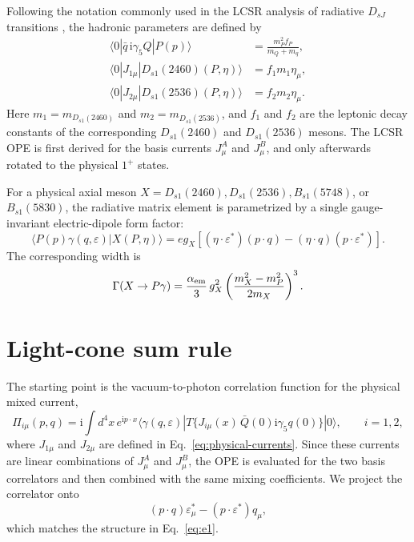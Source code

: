 \documentclass[aps,prd,preprint,nofootinbib,superscriptaddress]{revtex4-2}
\newcommand{\ii}{\mathrm{i}}
\newcommand{\Dsone}{D_{s1}}
\newcommand{\Bsone}{B_{s1}}
\begin{document}
Following the notation commonly used in the LCSR analysis of radiative
$D_{sJ}$ transitions \cite{Colangelo:2005hv}, the hadronic parameters are
defined by
\begin{align}
  \langle 0|\bar q\,\ii\gamma_5 Q|P(p)\rangle
  &=
  \frac{m_P^2 f_P}{m_Q+m_q},\label{eq:fp-def}\\
  \langle0|J_{1\mu}|\Dsone(2460)(P,\eta)\rangle
  &=f_1 m_1\eta_\mu,\label{eq:f1-def}\\
  \langle0|J_{2\mu}|\Dsone(2536)(P,\eta)\rangle
  &=f_2 m_2\eta_\mu.\label{eq:f2-def}
\end{align}
Here $m_1=m_{\Dsone(2460)}$ and $m_2=m_{\Dsone(2536)}$, and $f_1$ and $f_2$
are the leptonic decay constants of the corresponding $\Dsone(2460)$ and
$\Dsone(2536)$ mesons.  The LCSR OPE is first derived for the basis currents
$J_\mu^A$ and $J_\mu^B$, and only afterwards rotated to the physical $1^+$
states.

For a physical axial meson $X=\Dsone(2460),\Dsone(2536),\Bsone(5748)$, or
$\Bsone(5830)$, the radiative matrix element is parametrized by a single
gauge-invariant electric-dipole form factor:
\begin{equation}
  \langle P(p)\gamma(q,\varepsilon)|X(P,\eta)\rangle
  =
  eg_X\left[(\eta\cdot\varepsilon^*)(p\cdot q)
  -(\eta\cdot q)(p\cdot\varepsilon^*)\right].
  \label{eq:e1}
\end{equation}
The corresponding width is
\begin{equation}
  \Gamma(X\to P\gamma)
  =
  \frac{\alpha_{\rm em}}{3}\,g_X^2
  \left(\frac{m_X^2-m_P^2}{2m_X}\right)^3 .
  \label{eq:width}
\end{equation}

\section{Light-cone sum rule}
\label{sec:sumrule}

The starting point is the vacuum-to-photon correlation function for the physical
mixed current,
\begin{equation}
  \Pi_{i\mu}(p,q)=\ii\int d^4x\,e^{\ii p\cdot x}
  \langle\gamma(q,\varepsilon)|
  T\{J_{i\mu}(x)\,\bar Q(0)\ii\gamma_5 q(0)\}
  |0\rangle ,
  \qquad i=1,2,
  \label{eq:corr}
\end{equation}
where $J_{1\mu}$ and $J_{2\mu}$ are defined in
Eq.~\eqref{eq:physical-currents}.  Since these currents are linear combinations
of $J_\mu^A$ and $J_\mu^B$, the OPE is evaluated for the two basis correlators
and then combined with the same mixing coefficients.  We project the correlator
onto
\begin{equation}
  (p\cdot q)\varepsilon_\mu^*-(p\cdot\varepsilon^*)q_\mu,
  \label{eq:projector}
\end{equation}
which matches the structure in Eq.~\eqref{eq:e1}.
\end{document}

